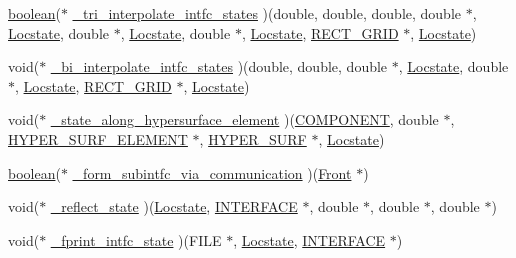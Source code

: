\begin{DoxyCompactItemize}
\item 
\hyperlink{cdecs_8h_ad048433382a936258fb49e2ec4f148e1}{boolean}($\ast$ \hyperlink{struct___f___u_s_e_r___i_n_t_e_r_f_a_c_e_a882929409fe04e6ca1f7d1089ecce72f}{\+\_\+tri\+\_\+interpolate\+\_\+intfc\+\_\+states} )(double, double, double, double $\ast$, \hyperlink{fdecs_8h_ace3c795e1cf7a6b6e5444944f0b59bcd}{Locstate}, double $\ast$, \hyperlink{fdecs_8h_ace3c795e1cf7a6b6e5444944f0b59bcd}{Locstate}, double $\ast$, \hyperlink{fdecs_8h_ace3c795e1cf7a6b6e5444944f0b59bcd}{Locstate}, \hyperlink{geom_8h_a983fdb6b46c9b99969bffa62eae7d31d}{R\+E\+C\+T\+\_\+\+G\+R\+ID} $\ast$, \hyperlink{fdecs_8h_ace3c795e1cf7a6b6e5444944f0b59bcd}{Locstate})
\item 
void($\ast$ \hyperlink{struct___f___u_s_e_r___i_n_t_e_r_f_a_c_e_a799d339e4bc989506fe30f9bd81838b5}{\+\_\+bi\+\_\+interpolate\+\_\+intfc\+\_\+states} )(double, double, double $\ast$, \hyperlink{fdecs_8h_ace3c795e1cf7a6b6e5444944f0b59bcd}{Locstate}, double $\ast$, \hyperlink{fdecs_8h_ace3c795e1cf7a6b6e5444944f0b59bcd}{Locstate}, \hyperlink{geom_8h_a983fdb6b46c9b99969bffa62eae7d31d}{R\+E\+C\+T\+\_\+\+G\+R\+ID} $\ast$, \hyperlink{fdecs_8h_ace3c795e1cf7a6b6e5444944f0b59bcd}{Locstate})
\item 
void($\ast$ \hyperlink{struct___f___u_s_e_r___i_n_t_e_r_f_a_c_e_a1d0c0dd0204eab6d93184f35c3896232}{\+\_\+state\+\_\+along\+\_\+hypersurface\+\_\+element} )(\hyperlink{int_8h_a2bb7be12ca59ea6443c8757df0a7c278}{C\+O\+M\+P\+O\+N\+E\+NT}, double $\ast$, \hyperlink{int_8h_a17e21ae7174174d7a55516f8c9a8f12f}{H\+Y\+P\+E\+R\+\_\+\+S\+U\+R\+F\+\_\+\+E\+L\+E\+M\+E\+NT} $\ast$, \hyperlink{int_8h_acef50fa4757ce0d3f75c97fab5a175bc}{H\+Y\+P\+E\+R\+\_\+\+S\+U\+RF} $\ast$, \hyperlink{fdecs_8h_ace3c795e1cf7a6b6e5444944f0b59bcd}{Locstate})
\item 
\hyperlink{cdecs_8h_ad048433382a936258fb49e2ec4f148e1}{boolean}($\ast$ \hyperlink{struct___f___u_s_e_r___i_n_t_e_r_f_a_c_e_aa76d26e4789ddf32a90359887ad19ec6}{\+\_\+form\+\_\+subintfc\+\_\+via\+\_\+communication} )(\hyperlink{fdecs_8h_ac32202b798f848095c489cfd04c4ca5f}{Front} $\ast$)
\item 
void($\ast$ \hyperlink{struct___f___u_s_e_r___i_n_t_e_r_f_a_c_e_a25c3a3e806dc5013492c1defa67e6d1a}{\+\_\+reflect\+\_\+state} )(\hyperlink{fdecs_8h_ace3c795e1cf7a6b6e5444944f0b59bcd}{Locstate}, \hyperlink{int_8h_a58cf562d0d320a608294b7310ea167dc}{I\+N\+T\+E\+R\+F\+A\+CE} $\ast$, double $\ast$, double $\ast$, double $\ast$)
\item 
void($\ast$ \hyperlink{struct___f___u_s_e_r___i_n_t_e_r_f_a_c_e_ac93ce4a8653bc84828ae9788d50be275}{\+\_\+fprint\+\_\+intfc\+\_\+state} )(F\+I\+LE $\ast$, \hyperlink{fdecs_8h_ace3c795e1cf7a6b6e5444944f0b59bcd}{Locstate}, \hyperlink{int_8h_a58cf562d0d320a608294b7310ea167dc}{I\+N\+T\+E\+R\+F\+A\+CE} $\ast$)

\end{DoxyCompactItemize}
